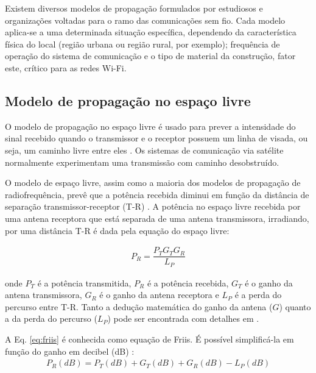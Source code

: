 Existem diversos modelos de propagação formulados por estudiosos e organizações voltadas para o ramo das comunicações sem fio. Cada modelo aplica-se a uma determinada situação específica, dependendo da característica física do local (região urbana ou região rural, por exemplo); frequência de operação do sistema de comunicação e o tipo de material da construção, fator este, crítico para as redes Wi-Fi.

\subsection{Modelo de propagação no espaço livre}
\label{sub:espaco-livre}

O modelo de propagação no espaço livre é usado para prever a intensidade do sinal recebido quando o transmissor e o receptor possuem um linha de visada, ou seja, um caminho livre entre eles \cite{rappaport2009}. Os sistemas de comunicação via satélite normalmente experimentam uma transmissão com caminho desobstruído.

O modelo de espaço livre, assim como a maioria dos modelos de propagação de radiofrequência, prevê que a potência recebida diminui em função da distância de separação transmissor-receptor (T-R) \cite{rappaport2009}. A potência no espaço livre recebida por uma antena receptora que está separada de uma antena transmissora, irradiando, por uma distância T-R é dada pela equação do espaço livre:

\begin{equation}
	\begin{aligned}
	\label{eq:friis}
		P_R = \dfrac{P_TG_TG_R}{L_P}
	\end{aligned}
\end{equation}

\noindent onde $P_T$ é a potência transmitida, $P_R$ é a potência recebida, $G_T$ é o ganho da antena transmissora, $G_R$ é o ganho da antena receptora e $L_P$ é a perda do percurso entre T-R. Tanto a dedução matemática do ganho da antena ($G$) quanto a da perda do percurso ($L_P$) pode ser encontrada com detalhes em .

A Eq. \eqref{eq:friis} é conhecida como equação de Friis. É possível simplificá-la em função do ganho em decibel (dB) \cite{haykin2008}:
\begin{equation}
	\begin{aligned}
	\label{eq:friis-decibel}
		P_R(dB) = P_T(dB) + G_T(dB) + G_R(dB) - L_P(dB)
	\end{aligned}
\end{equation}

